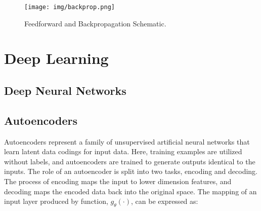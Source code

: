
\begin{figure}[h!]
    \centering
    \texttt{[image: img/backprop.png]}
    \caption{Feedforward and Backpropagation Schematic.}
    \label{fig:backprop}
\end{figure}







\section{Deep Learning} \label{sec:deeplearning}

\subsection{Deep Neural Networks}


\subsection{Autoencoders}


Autoencoders represent a family of unsupervised artificial neural networks that learn latent data codings for input data. Here, training examples are utilized without labels, and autoencoders are trained to generate outputs identical to the inputs. The role of an autoencoder is split into two tasks, encoding and decoding. The process of encoding maps the input to lower dimension features, and decoding maps the encoded data back into the original space. The mapping of an input layer produced by function, $g_{\theta}(\cdot)$, can be expressed as:
 
